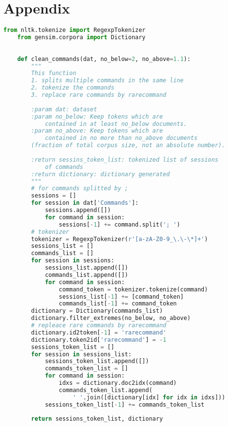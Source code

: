 \appendix
\chapter{Appendix}
\begin{lstlisting}[language=Python, caption={Python code for tokeniser}, label={lst:tokeniser}]
    from nltk.tokenize import RegexpTokenizer
    from gensim.corpora import Dictionary
    
    
    def clean_commands(dat, no_below=2, no_above=1.1):
        """
        This function 
        1. splits multiple commands in the same line
        2. tokenize the commands
        3. replace rare commands by rarecommand
    
        :param dat: dataset
        :param no_below: Keep tokens which are 
            contained in at least no_below documents.
        :param no_above: Keep tokens which are 
            contained in no more than no_above documents 
        (fraction of total corpus size, not an absolute number).
    
        :return sessins_token_list: tokenized list of sessions 
            of commands
        :return dictionary: dictionary generated
        """
        # for commands splitted by ;
        sessions = []
        for session in dat['Commands']:
            sessions.append([])
            for command in session:
                sessions[-1] += command.split('; ')
        # tokenizer
        tokenizer = RegexpTokenizer(r'[a-zA-Z0-9_\.\-\*]+')
        sessions_list = []
        commands_list = []
        for session in sessions:
            sessions_list.append([])
            commands_list.append([])
            for command in session:
                command_token = tokenizer.tokenize(command)
                sessions_list[-1] += [command_token]
                commands_list[-1] += command_token
        dictionary = Dictionary(commands_list)
        dictionary.filter_extremes(no_below, no_above)
        # repleace rare commands by rarecommand
        dictionary.id2token[-1] = 'rarecommand'
        dictionary.token2id['rarecommand'] = -1
        sessions_token_list = []
        for session in sessions_list:
            sessions_token_list.append([])
            commands_token_list = []
            for command in session:
                idxs = dictionary.doc2idx(command)
                commands_token_list.append(
                    ' '.join([dictionary[idx] for idx in idxs]))
            sessions_token_list[-1] += commands_token_list
    
        return sessions_token_list, dictionary
\end{lstlisting}


